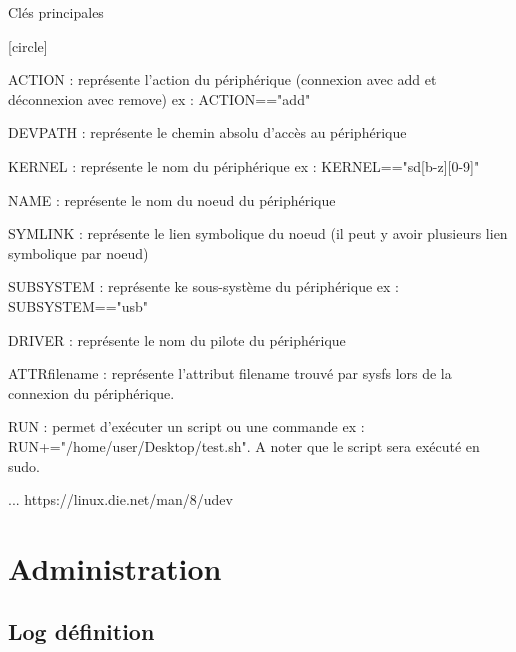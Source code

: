 \documentclass{beamer}
\begin{document}
\begin{frame}
\begin{block}{Clés principales } 
	
	\begin{itemize}
		
		[circle]
		\footnotesize{
		\item ACTION : représente l'action du périphérique (connexion avec add et déconnexion avec remove) ex : ACTION=="add"
		\item DEVPATH : représente le chemin absolu d'accès au périphérique
		\item KERNEL : représente le nom du périphérique ex : KERNEL=="sd[b-z][0-9]"
		\item NAME : représente le nom du noeud du périphérique
		\item SYMLINK : représente le lien symbolique du noeud (il peut y avoir plusieurs lien symbolique par noeud)
		\item SUBSYSTEM : représente ke sous-système du périphérique ex : SUBSYSTEM=="usb"
		\item DRIVER : représente le nom du pilote du périphérique
		\item ATTR{filename} : représente l'attribut filename trouvé par sysfs lors de la connexion du périphérique.
		\item RUN : permet d'exécuter un script ou une commande ex : RUN+="/home/user/Desktop/test.sh". A noter que le script sera exécuté en sudo.
		\item ...
		https://linux.die.net/man/8/udev
	}
	\end{itemize}
\end{block}
\end{frame}

\section{Administration}

\subsection{Log définition}
\end{document}

